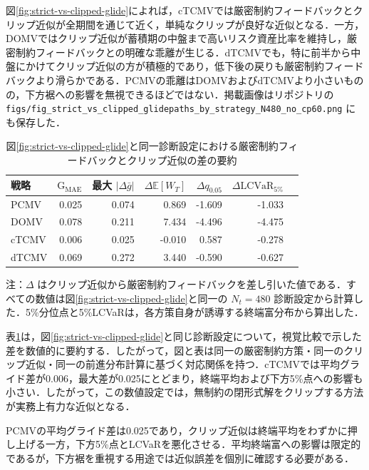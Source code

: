 \documentclass[10pt,a4paper]{article}
\theoremstyle{plain}
\theoremstyle{definition}
\newcommand{\E}{\mathbb{E}}
\begin{document}
図\ref{fig:strict-vs-clipped-glide}によれば，cTCMVでは厳密制約フィードバックとクリップ近似が全期間を通じて近く，単純なクリップが良好な近似となる．一方，DOMVではクリップ近似が蓄積期の中盤まで高いリスク資産比率を維持し，厳密制約フィードバックとの明確な乖離が生じる．dTCMVでも，特に前半から中盤にかけてクリップ近似の方が積極的であり，低下後の戻りも厳密制約フィードバックより滑らかである．PCMVの乖離はDOMVおよびdTCMVより小さいものの，下方裾への影響を無視できるほどではない．掲載画像はリポジトリの \texttt{figs/fig\_strict\_vs\_clipped\_glidepaths\_by\_strategy\_N480\_no\_cp60.png} にも保存した．

\begin{table}[H]
\centering
\caption{図\ref{fig:strict-vs-clipped-glide}と同一診断設定における厳密制約フィードバックとクリップ近似の差の要約}
\label{tab:strict-vs-clipped-summary}
\begin{tabular}{lrrrrrr}
\toprule
戦略 & $\mathrm{G}_{\mathrm{MAE}}$ & 最大 $|\Delta \bar g|$ & $\Delta \E[W_T]$ & $\Delta q_{0.05}$ & $\Delta \mathrm{LCVaR}_{5\%}$ \\
\midrule
PCMV  & 0.025 & 0.074 & 0.869 & -1.609 & -1.033 \\
DOMV  & 0.078 & 0.211 & 7.434 & -4.496 & -4.475 \\
cTCMV & 0.006 & 0.025 & -0.010 & 0.587 & -0.278 \\
dTCMV & 0.069 & 0.272 & 3.440 & -0.590 & -0.627 \\
\bottomrule
\end{tabular}
\begin{flushleft}
\footnotesize 注：$\Delta$ はクリップ近似から厳密制約フィードバックを差し引いた値である．すべての数値は図\ref{fig:strict-vs-clipped-glide}と同一の $N_t=480$ 診断設定から計算した．5\%分位点と5\%LCVaRは，各方策自身が誘導する終端富分布から算出した．
\end{flushleft}
\end{table}

表\ref{tab:strict-vs-clipped-summary}は，図\ref{fig:strict-vs-clipped-glide}と同じ診断設定について，視覚比較で示した差を数値的に要約する．したがって，図と表は同一の厳密制約方策・同一のクリップ近似・同一の前進分布計算に基づく対応関係を持つ．cTCMVでは平均グライド差が0.006，最大差が0.025にとどまり，終端平均および下方5\%点への影響も小さい．したがって，この数値設定では，無制約の閉形式解をクリップする方法が実務上有力な近似となる．

PCMVの平均グライド差は0.025であり，クリップ近似は終端平均をわずかに押し上げる一方，下方5\%点とLCVaRを悪化させる．平均終端富への影響は限定的であるが，下方裾を重視する用途では近似誤差を個別に確認する必要がある．
\end{document}
